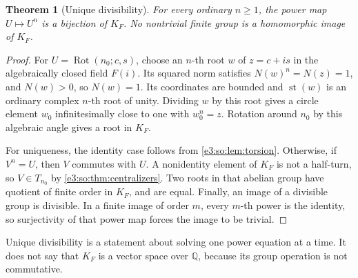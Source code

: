\documentclass[11pt,letterpaper]{article}
\numberwithin{equation}{section}
\newtheorem{theorem}{Theorem}[section]
\theoremstyle{definition}
\theoremstyle{remark}
\newcommand{\Q}{\mathbb Q}
\newcommand{\st}{\operatorname{st}}
\newcommand{\Rot}{\operatorname{Rot}}
\begin{document}
\begin{theorem}[Unique divisibility]\label{e3:so:thm:divisible}
For every ordinary \(n\ge1\), the power map \(U\mapsto U^n\) is a bijection
of \(K_F\). No nontrivial finite group is a homomorphic image of \(K_F\).
\end{theorem}
\begin{proof}
For \(U=\Rot(n_0;c,s)\), choose an \(n\)-th root \(w\) of \(z=c+is\) in the
algebraically closed field \(F(i)\). Its squared norm satisfies
\(N(w)^n=N(z)=1\), and \(N(w)>0\), so \(N(w)=1\). Its coordinates are bounded
and \(\st(w)\) is an ordinary complex \(n\)-th root of unity. Dividing \(w\)
by this root gives a circle element \(w_0\) infinitesimally close to one with
\(w_0^n=z\). Rotation around \(n_0\) by this algebraic angle gives a root in
\(K_F\).

For uniqueness, the identity case follows from \cref{e3:so:lem:torsion}. Otherwise,
if \(V^n=U\), then \(V\) commutes with \(U\). A nonidentity element of \(K_F\)
is not a half-turn, so \(V\in T_{n_0}\) by \cref{e3:so:thm:centralizers}. Two roots
in that abelian group have quotient of finite order in \(K_F\), and are equal.
Finally, an image of a divisible group is divisible. In a finite image of order
\(m\), every \(m\)-th power is the identity, so surjectivity of that power map
forces the image to be trivial.
\end{proof}

Unique divisibility is a statement about solving one power equation at a time.
It does not say that \(K_F\) is a vector space over \(\Q\), because its group
operation is not commutative.
\end{document}
